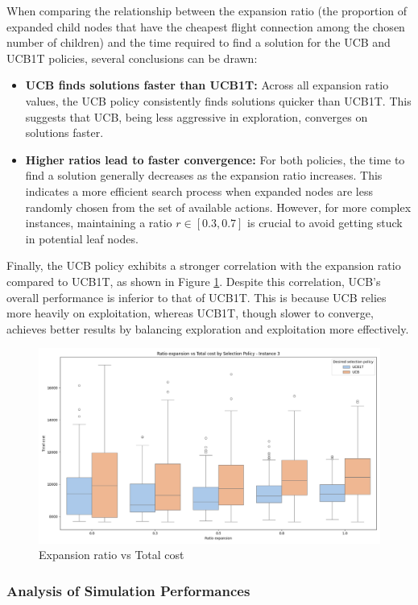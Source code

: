 When comparing the relationship between the expansion ratio (the proportion of expanded child nodes that have the cheapest flight connection among the chosen number of children) and the time required to find a solution for the UCB and UCB1T policies, several conclusions can be drawn:

\begin{itemize}
    \item \textbf{UCB finds solutions faster than UCB1T:}
          Across all expansion ratio values, the UCB policy consistently finds solutions quicker than UCB1T. This suggests that UCB, being less aggressive in exploration, converges on solutions faster.

    \item \textbf{Higher ratios lead to faster convergence:}
          For both policies, the time to find a solution generally decreases as the expansion ratio increases. This indicates a more efficient search process when expanded nodes are less randomly chosen from the set of available actions. However, for more complex instances, maintaining a ratio \( r \in [0.3, 0.7] \) is crucial to avoid getting stuck in potential leaf nodes.
\end{itemize}

Finally, the UCB policy exhibits a stronger correlation with the expansion ratio compared to UCB1T, as shown in Figure \ref{fig:ratio_vs_cost_3}. Despite this correlation, UCB's overall performance is inferior to that of UCB1T. This is because UCB relies more heavily on exploitation, whereas UCB1T, though slower to converge, achieves better results by balancing exploration and exploitation more effectively.

\begin{figure}[!ht]
    \centering
    \includegraphics[width=.4\textwidth]{Figures/3 - ratio_vs_cost.png}
    \caption{Expansion ratio vs Total cost}
    \label{fig:ratio_vs_cost_3}
\end{figure}

\subsubsection*{Analysis of Simulation Performances}

